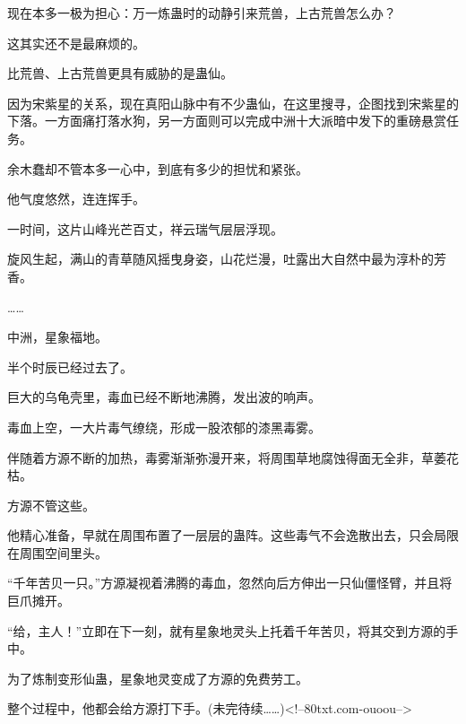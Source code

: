 \begin{this_body}
现在本多一极为担心：万一炼蛊时的动静引来荒兽，上古荒兽怎么办？

这其实还不是最麻烦的。

比荒兽、上古荒兽更具有威胁的是蛊仙。

因为宋紫星的关系，现在真阳山脉中有不少蛊仙，在这里搜寻，企图找到宋紫星的下落。一方面痛打落水狗，另一方面则可以完成中洲十大派暗中发下的重磅悬赏任务。

余木蠢却不管本多一心中，到底有多少的担忧和紧张。

他气度悠然，连连挥手。

一时间，这片山峰光芒百丈，祥云瑞气层层浮现。

旋风生起，满山的青草随风摇曳身姿，山花烂漫，吐露出大自然中最为淳朴的芳香。

……

中洲，星象福地。

半个时辰已经过去了。

巨大的乌龟壳里，毒血已经不断地沸腾，发出波的响声。

毒血上空，一大片毒气缭绕，形成一股浓郁的漆黑毒雾。

伴随着方源不断的加热，毒雾渐渐弥漫开来，将周围草地腐蚀得面无全非，草萎花枯。

方源不管这些。

他精心准备，早就在周围布置了一层层的蛊阵。这些毒气不会逸散出去，只会局限在周围空间里头。

“千年苦贝一只。”方源凝视着沸腾的毒血，忽然向后方伸出一只仙僵怪臂，并且将巨爪摊开。

“给，主人！”立即在下一刻，就有星象地灵头上托着千年苦贝，将其交到方源的手中。

为了炼制变形仙蛊，星象地灵变成了方源的免费劳工。

整个过程中，他都会给方源打下手。(未完待续……)<!--80txt.com-ouoou-->

\end{this_body}

